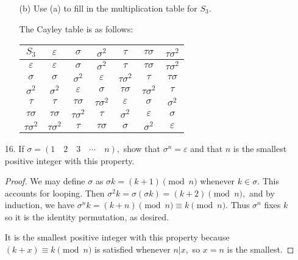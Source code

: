 \documentclass{article}
\begin{document}
\begin{itemize}
\begin{itemize}
			\item[(b)] Use (a) to fill in the multiplication table for $S_3.$
				\begin{soln}
					The Cayley table is as follows:
					\begin{center}
						\begin{tabular}{c|cccccc}
							$S_3$ & $\varepsilon$ & $\sigma$ & $\sigma^2$ & $\tau$ & $\tau\sigma$ & $\tau\sigma^2$ \\
							\hline
							$\varepsilon$ & $\varepsilon$ & $\sigma$ & $\sigma^2$ & $\tau$ & $\tau\sigma$ & $\tau\sigma^2$ \\
							$\sigma$ & $\sigma$ & $\sigma^2$ & $\varepsilon$ & $\tau\sigma^2$ & $\tau$ & $\tau\sigma$ \\
							$\sigma^2$ & $\sigma^2$ & $\varepsilon$ & $\sigma$ & $\tau\sigma$ & $\tau\sigma^2$ & $\tau$ \\
							$\tau$ & $\tau$ & $\tau\sigma$ & $\tau\sigma^2$ & $\varepsilon$ & $\sigma$ & $\sigma^2$ \\
							$\tau\sigma$ & $\tau\sigma$ & $\tau\sigma^2$ & $\tau$ & $\sigma^2$ & $\varepsilon$ & $\sigma$ \\
							$\tau\sigma^2$ & $\tau\sigma^2$ & $\tau$ & $\tau\sigma$ & $\sigma$ & $\sigma^2$ & $\varepsilon$
						\end{tabular}
					\end{center}
				\end{soln}

		\end{itemize}	

	\item[16.] If $\sigma=(1\quad2\quad3\quad\cdots\quad n),$ show that $\sigma^n=\varepsilon$ and that $n$ is the smallest positive integer with this property.
		\begin{proof}
			We may define $\sigma$ as $\sigma k = (k+1)\pmod n$ whenever $k\in\sigma.$ This accounts for looping. Then $\sigma^2 k=\sigma(\sigma k) = (k+2)\pmod n,$ and by induction, we have $\sigma^n k = (k+n) \pmod n \equiv k\pmod n.$ Thus $\sigma^n$ fixes $k$ so it is the identity permutation, as desired. 

			It is the smallest positive integer with this property because $(k+x)\equiv k\pmod n$ is satisfied whenever $n|x,$ so $x=n$ is the smallest.
			
		\end{proof}
		
\end{itemize}
\end{document}
